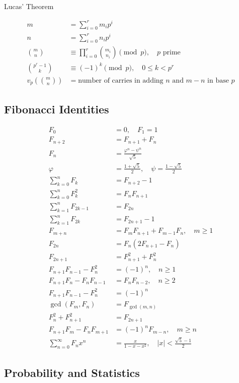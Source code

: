 Lucas' Theorem

\begin{align*}
m &= \sum_{i=0}^{r}m_ip^i\\
n &= \sum_{i=0}^{r}n_ip^i\\
\binom mn
&\equiv \prod_{i=0}^{r}\binom{m_i}{n_i}\pmod p,
\quad p\text{ prime}\\
\binom{p^r-1}{k}
&\equiv(-1)^k\pmod p,\quad 0\le k<p^r\\
v_p\left(\binom mn\right)
&= \text{number of carries in adding }n\text{ and }m-n
\text{ in base }p
\end{align*}



\subsection{Fibonacci Identities}

\begin{align*}
F_0&=0,\quad F_1=1\\
F_{n+2}&=F_{n+1}+F_n\\
F_n&=\frac{\varphi^n-\psi^n}{\sqrt5}\\
\varphi&=\frac{1+\sqrt5}{2},
\quad\psi=\frac{1-\sqrt5}{2}\\
\sum_{k=0}^{n}F_k&=F_{n+2}-1\\
\sum_{k=0}^{n}F_k^2&=F_nF_{n+1}\\
\sum_{k=1}^{n}F_{2k-1}&=F_{2n}\\
\sum_{k=1}^{n}F_{2k}&=F_{2n+1}-1\\
F_{m+n}&=F_mF_{n+1}+F_{m-1}F_n,
\quad m\ge1\\
F_{2n}&=F_n(2F_{n+1}-F_n)\\
F_{2n+1}&=F_{n+1}^2+F_n^2\\
F_{n+1}F_{n-1}-F_n^2&=(-1)^n,\quad n\ge1\\
F_{n+1}F_n-F_nF_{n-1}&=F_nF_{n-2},
\quad n\ge2\\
F_{n+1}F_{n-1}-F_n^2&=(-1)^n\\
\gcd(F_m,F_n)&=F_{\gcd(m,n)}\\
F_n^2+F_{n+1}^2&=F_{2n+1}\\
F_{n+1}F_m-F_nF_{m+1}
&=(-1)^nF_{m-n},
\quad m\ge n\\
\sum_{n=0}^{\infty}F_nx^n
&=\frac{x}{1-x-x^2},
\quad |x|<\frac{\sqrt5-1}{2}
\end{align*}



\subsection{Probability and Statistics}

